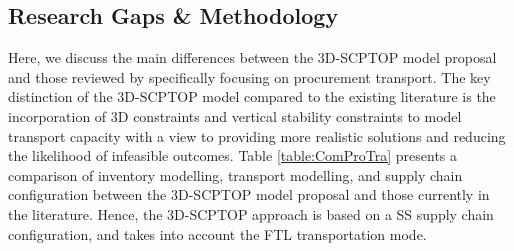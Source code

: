 \subsection{Research Gaps \& Methodology}


Here, we discuss the main differences between the 3D-SCPTOP model proposal and those reviewed by specifically focusing on procurement transport. The key distinction of the 3D-SCPTOP model compared to the existing literature is the incorporation of 3D constraints and vertical stability constraints to model transport capacity with a view to providing more realistic solutions and reducing the likelihood of infeasible outcomes.   Table \ref{table:ComProTra}  presents a comparison of inventory modelling, transport modelling, and supply chain configuration between the 3D-SCPTOP model proposal and those currently in the literature.
Hence,  the 3D-SCPTOP approach is based on a SS supply chain configuration, and takes into account the FTL transportation mode.
